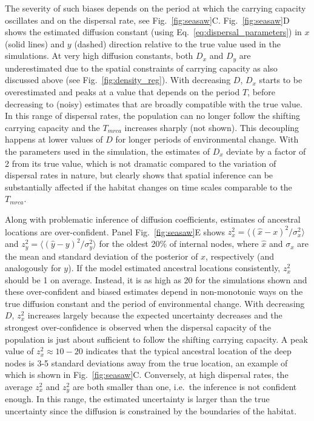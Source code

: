 \documentclass[aps,rmp, twocolumn]{revtex4}
\begin{document}
The severity of such biases depends on the period at which the carrying capacity oscillates and on the dispersal rate, see  Fig.~\ref{fig:seasaw}C.
Fig.~\ref{fig:seasaw}D shows the estimated diffusion constant (using Eq.~\ref{eq:dispersal_parameters}) in $x$ (solid lines) and $y$ (dashed) direction relative to the true value used in the simulations.
At very high diffusion constants, both $D_x$ and $D_y$ are underestimated due to the spatial constraints of carrying capacity as also discussed above (see Fig.~\ref{fig:density_reg}).
With decreasing $D$, $D_x$ starts to be overestimated and peaks at a value that depends on the period $T$, before decreasing to (noisy) estimates that are broadly compatible with the true value.
In this range of dispersal rates, the population can no longer follow the shifting carrying capacity and the $T_{mrca}$ increases sharply (not shown).
This decoupling happens at lower values of $D$ for longer periods of environmental change.
With the parameters used in the simulation, the estimates of $D_x$ deviate by a factor of 2 from its true value, which is not dramatic compared to the variation of dispersal rates in nature, but clearly shows that spatial inference can be substantially affected if the habitat changes on time scales comparable to the $T_{mrca}$.

Along with problematic inference of diffusion coefficients, estimates of ancestral locations are over-confident.
Panel Fig.~\ref{fig:seasaw}E shows $z_x^2 = \langle (\hat{x} - x)^2/\sigma_x^2 \rangle$ and $z_y^2=\langle (\hat{y} - y)^2/\sigma_y^2\rangle$ for the oldest 20\% of internal nodes, where $\hat{x}$ and $\sigma_x$ are the mean and standard deviation of the posterior of $x$, respectively (and analogously for $y$).
If the model estimated ancestral locations consistently, $z_x^2$ should be 1 on average.
Instead, it is as high as 20 for the simulations shown and these over-confident and biased estimates depend in non-monotonic ways on the true diffusion constant and the period of environmental change.
With decreasing $D$, $z_x^2$ increases largely because the expected uncertainty decreases and the strongest over-confidence is observed when the dispersal capacity of the population is just about sufficient to follow the shifting carrying capacity.
A peak value of $z_x^2\approx 10-20$ indicates that the typical ancestral location of the deep nodes is 3-5 standard deviations away from the true location, an example of which is shown in Fig.~\ref{fig:seasaw}C.
Conversely, at high dispersal rates, the average $z_x^2$ and $z_y^2$ are both smaller than one, i.e.~the inference is not confident enough.
In this range, the estimated uncertainty is larger than the true uncertainty since the diffusion is constrained by the boundaries of the habitat.
\end{document}
